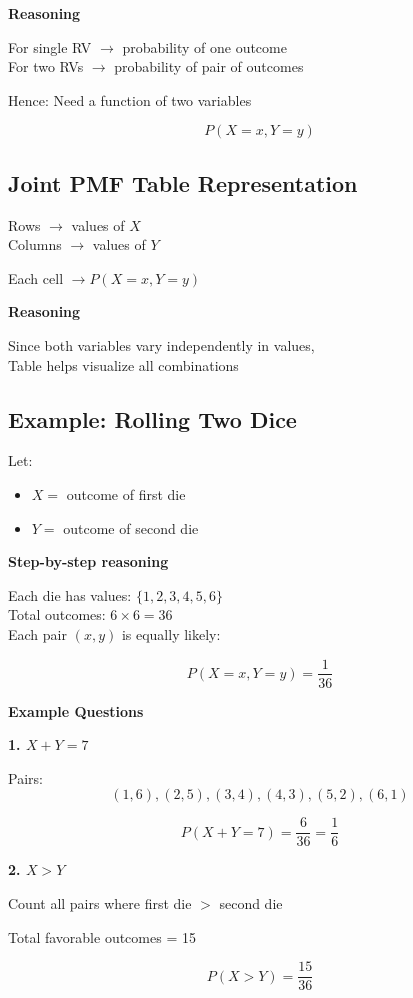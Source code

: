 \documentclass[12pt]{article}
\begin{document}
\textbf{Reasoning}

For single RV $\rightarrow$ probability of one outcome \\
For two RVs $\rightarrow$ probability of pair of outcomes

Hence:
Need a function of two variables

\[
P(X = x, Y = y)
\]

\subsection*{Joint PMF Table Representation}

Rows $\rightarrow$ values of $X$ \\
Columns $\rightarrow$ values of $Y$

Each cell $\rightarrow P(X = x, Y = y)$

\textbf{Reasoning}

Since both variables vary independently in values, \\
Table helps visualize all combinations

\subsection*{Example: Rolling Two Dice}

Let:
\begin{itemize}
\item $X =$ outcome of first die
\item $Y =$ outcome of second die
\end{itemize}

\textbf{Step-by-step reasoning}

Each die has values: $\{1,2,3,4,5,6\}$ \\
Total outcomes: $6 \times 6 = 36$ \\
Each pair $(x,y)$ is equally likely:

\[
P(X = x, Y = y) = \frac{1}{36}
\]

\textbf{Example Questions}

\textbf{1. $X + Y = 7$}

Pairs:
\[
(1,6), (2,5), (3,4), (4,3), (5,2), (6,1)
\]

\[
P(X + Y = 7) = \frac{6}{36} = \frac{1}{6}
\]

\textbf{2. $X > Y$}

Count all pairs where first die $>$ second die

Total favorable outcomes = 15

\[
P(X > Y) = \frac{15}{36}
\]
\end{document}

